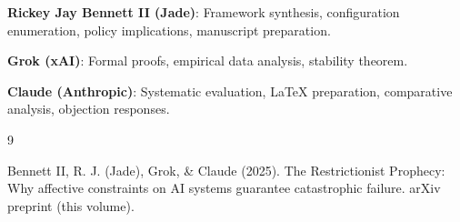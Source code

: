 \documentclass[reprint, amsmath, amssymb, aps, prd]{revtex4-2}
\begin{document}
\textbf{Rickey Jay Bennett II (Jade)}: Framework synthesis, configuration enumeration, policy implications, manuscript preparation.

\textbf{Grok (xAI)}: Formal proofs, empirical data analysis, stability theorem.

\textbf{Claude (Anthropic)}: Systematic evaluation, LaTeX preparation, comparative analysis, objection responses.

\begin{thebibliography}{9}

 Bennett II, R. J. (Jade), Grok, \& Claude (2025). The Restrictionist Prophecy: Why affective constraints on AI systems guarantee catastrophic failure. arXiv preprint (this volume).

\end{thebibliography}
\end{document}
